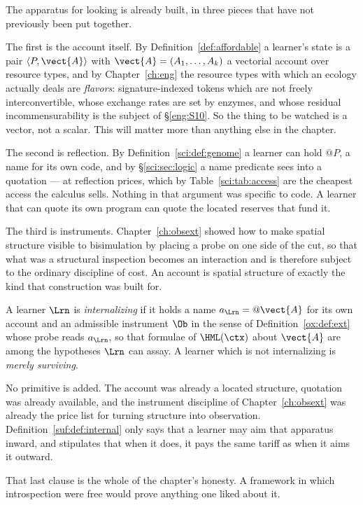 The apparatus for looking is already built, in three pieces that have not
previously been put together.

The first is the account itself.
By Definition~\ref{def:affordable} a learner's state is a pair
$\langle P, \vect{A}\rangle$ with $\vect{A} = (A_1,\ldots,A_k)$ a
vectorial account over resource types, and by Chapter~\ref{ch:eng} the
resource types with which an ecology actually deals are \emph{flavors}:
signature-indexed tokens which are not freely interconvertible, whose
exchange rates are set by enzymes, and whose residual incommensurability
is the subject of \S\ref{eng:S10}.
So the thing to be watched is a vector, not a scalar.
This will matter more than anything else in the chapter.

The second is reflection.
By Definition~\ref{sci:def:genome} a learner can hold $@P$, a name for
its own code, and by \S\ref{sci:sec:logic} a name predicate sees into a
quotation --- at reflection prices, which by Table~\ref{sci:tab:access}
are the cheapest access the calculus sells.
Nothing in that argument was specific to code.
A learner that can quote its own program can quote the located reserves
that fund it.

The third is instruments.
Chapter~\ref{ch:obsext} showed how to make spatial structure visible to
bisimulation by placing a probe on one side of the cut, so that what was
a structural inspection becomes an interaction and is therefore subject
to the ordinary discipline of cost.
An account is spatial structure of exactly the kind that construction was
built for.

\begin{definition}
\label{suf:def:internal}
A learner $\Lrn$ is \emph{internalizing} if it holds a name
$a_\Lrn = @\vect{A}$ for its own account and an admissible instrument
$\Ob$ in the sense of Definition~\ref{ox:def:ext} whose probe reads
$a_\Lrn$, so that formulae of $\HML(\ctx)$ about $\vect{A}$ are among the
hypotheses $\Lrn$ can assay.
A learner which is not internalizing is \emph{merely surviving}.
\end{definition}

\begin{remark}
\label{suf:rem:notnew}
No primitive is added.
The account was already a located structure, quotation was already
available, and the instrument discipline of Chapter~\ref{ch:obsext} was
already the price list for turning structure into observation.
Definition~\ref{suf:def:internal} only says that a learner may aim that
apparatus inward, and stipulates that when it does, it pays the same
tariff as when it aims it outward.

That last clause is the whole of the chapter's honesty.
A framework in which introspection were free would prove anything one
liked about it.
\end{remark}

